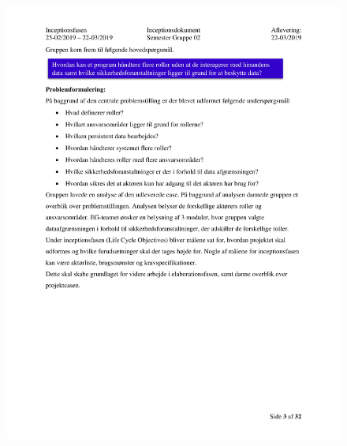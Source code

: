 \begin{figure}[hb]
  \includegraphics[scale = 0.33]{./PNG/Inceptions/Gruppe 02 + InceptionsDokument-04.jpg} 
\end{figure}

